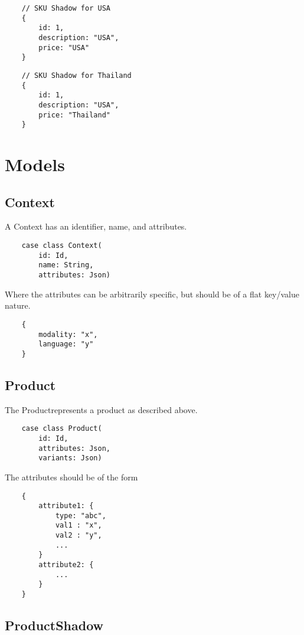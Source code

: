 \documentclass[11pt]{article}
\begin{document}
\begin{lstlisting}
    // SKU Shadow for USA
    {
        id: 1,
        description: "USA",
        price: "USA"
    }
\end{lstlisting}

\begin{lstlisting}
    // SKU Shadow for Thailand
    {
        id: 1,
        description: "USA",
        price: "Thailand"
    }
\end{lstlisting}

\section{Models}

\subsection{Context}

A Context has an identifier, name, and attributes. 
\begin{lstlisting}
    case class Context(
        id: Id,
        name: String,
        attributes: Json)
\end{lstlisting}

Where the attributes can be arbitrarily specific, but should be of a flat key/value nature.

\begin{lstlisting}
    {
        modality: "x",
        language: "y"
    }
\end{lstlisting}


\subsection{Product}

The Productrepresents a product as described above. 

\begin{lstlisting}
    case class Product(
        id: Id,
        attributes: Json,
        variants: Json)
\end{lstlisting}

The attributes should be of the form
\begin{lstlisting}
    {
        attribute1: {
            type: "abc",
            val1 : "x",
            val2 : "y",
            ...
        }
        attribute2: {
            ...
        }
    }
\end{lstlisting}


\subsection{ProductShadow}
\end{document}
